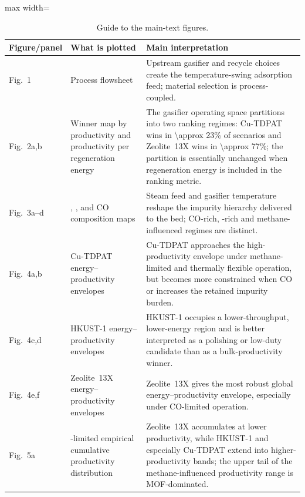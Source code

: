 \documentclass[11pt,a4paper]{article}
\newcommand{\Htwo}{\ce{H2}}
\newcommand{\COtwo}{\ce{CO2}}
\newcommand{\CHfour}{\ce{CH4}}
\newcommand{\TSA}{temperature-swing adsorption}
\begin{document}
\begin{table}[htbp]
\centering
\caption{Guide to the main-text figures.}
\label{tabS:panelguide}
\scriptsize
\begin{adjustbox}{max width=\textwidth}
\begin{tabular}{p{}p{}p{}}
\toprule
Figure/panel & What is plotted & Main interpretation \\
\midrule
Fig.~1 &
Process flowsheet &
Upstream gasifier and recycle choices create the \TSA{} feed; material
selection is process-coupled. \\

Fig.~2a,b &
Winner map by productivity and productivity per regeneration energy &
The gasifier operating space partitions into two ranking regimes:
Cu-TDPAT wins in \num{\approx 23}\% of scenarios and Zeolite~13X wins
in \num{\approx 77}\%; the partition is essentially unchanged when
regeneration energy is included in the ranking metric. \\

Fig.~3a--d &
\Htwo{}, \COtwo{}, \CHfour{} and CO composition maps &
Steam feed and gasifier temperature reshape the impurity hierarchy
delivered to the bed; CO-rich, \COtwo-rich and methane-influenced
regimes are distinct. \\

Fig.~4a,b &
Cu-TDPAT energy--productivity envelopes &
Cu-TDPAT approaches the high-productivity envelope under methane-limited
and thermally flexible operation, but becomes more constrained when CO
or \COtwo{} increases the retained impurity burden. \\

Fig.~4c,d &
HKUST-1 energy--productivity envelopes &
HKUST-1 occupies a lower-throughput, lower-energy region and is better
interpreted as a polishing or low-duty candidate than as a
bulk-productivity winner. \\

Fig.~4e,f &
Zeolite~13X energy--productivity envelopes &
Zeolite~13X gives the most robust global energy--productivity envelope,
especially under CO-limited operation. \\

Fig.~5a &
\CHfour-limited empirical cumulative productivity distribution &
Zeolite~13X accumulates at lower productivity, while HKUST-1 and
especially Cu-TDPAT extend into higher-productivity bands; the upper tail
of the methane-influenced productivity range is MOF-dominated. \\


\end{tabular}
\end{adjustbox}
\end{table}
\end{document}
